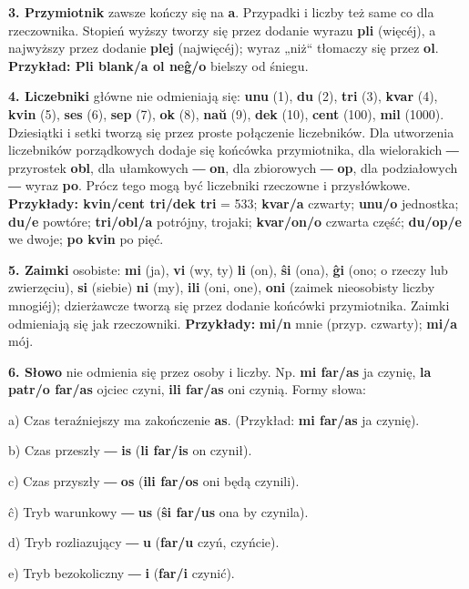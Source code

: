 \textbf{3. Przymiotnik} zawsze kończy się na \textbf{a}. Przypadki i liczby też same co dla rzeczownika. Stopień wyższy tworzy się przez dodanie wyrazu \textbf{pli} (więcéj), a najwyższy przez dodanie \textbf{plej} (najwięcéj); wyraz „niż“ tłomaczy się przez \textbf{ol}. \textbf{Przykład: Pli blank/a ol neĝ/o} bielszy od śniegu.

\textbf{4. Liczebniki} główne nie odmieniają się: \textbf{unu} (1), \textbf{du} (2), \textbf{tri} (3), \textbf{kvar} (4), \textbf{kvin} (5), \textbf{ses} (6), \textbf{sep} (7), \textbf{ok} (8), \textbf{naŭ} (9), \textbf{dek} (10), \textbf{cent} (100), \textbf{mil} (1000). Dziesiątki i setki tworzą się przez proste połączenie liczebników. Dla utworzenia liczebników porządkowych dodaje się końcówka przymiotnika, dla wielorakich ― przyrostek \textbf{obl}, dla ułamkowych ― \textbf{on}, dla zbiorowych ― \textbf{op}, dla podziałowych ― wyraz \textbf{po}. Prócz tego mogą być liczebniki rzeczowne i przysłówkowe. \textbf{Przykłady: kvin/cent tri/dek tri} = 533; \textbf{kvar/a} czwarty; \textbf{unu/o} jednostka; \textbf{du/e} powtóre; \textbf{tri/obl/a} potrójny, trojaki; \textbf{kvar/on/o} czwarta część; \textbf{du/op/e} we dwoje; \textbf{po kvin} po pięć.

\textbf{5. Zaimki} osobiste: \textbf{mi} (ja), \textbf{vi} (wy, ty) \textbf{li} (on), \textbf{ŝi} (ona), \textbf{ĝi} (ono; o rzeczy lub zwierzęciu), \textbf{si} (siebie) \textbf{ni} (my), \textbf{ili} (oni, one), \textbf{oni} (zaimek nieosobisty liczby mnogiéj); dzierżawcze tworzą się przez dodanie końcówki przymiotnika. Zaimki odmieniają się jak rzeczowniki. \textbf{Przykłady:} \textbf{mi/n} mnie (przyp. czwarty); \textbf{mi/a} mój.

\textbf{6. Słowo} nie odmienia się przez osoby i liczby. Np. \textbf{mi far/as} ja czynię, \textbf{la patr/o far/as} ojciec czyni, \textbf{ili far/as} oni czynią. Formy słowa:

a) Czas teraźniejszy ma zakończenie \textbf{as}. (Przykład: \textbf{mi far/as} ja czynię).

b) Czas przeszły ― \textbf{is} (\textbf{li far/is} on czynił).

c) Czas przyszły ― \textbf{os} (\textbf{ili far/os} oni będą czynili).

ĉ) Tryb warunkowy ― \textbf{us} (\textbf{ŝi far/us} ona by czynila).

d) Tryb rozliazujący ― \textbf{u} (\textbf{far/u} czyń, czyńcie).

e) Tryb bezokoliczny ― \textbf{i} (\textbf{far/i} czynić).

